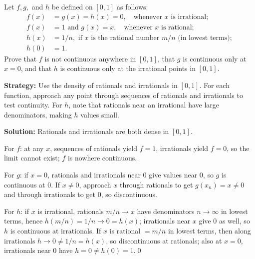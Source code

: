 \begin{problembox}
\begin{problemstatement}
Let \( f, g, \) and \( h \) be defined on \([0, 1]\) as follows:
\begin{align*}
f(x) &= g(x) = h(x) = 0, \quad \text{whenever } x \text{ is irrational}; \\
f(x) &= 1 \text{ and } g(x) = x, \quad \text{whenever } x \text{ is rational}; \\
h(x) &= 1/n, \text{ if } x \text{ is the rational number } m/n \text{ (in lowest terms)}; \\
h(0) &= 1.
\end{align*}
Prove that \( f \) is not continuous anywhere in \([0, 1]\), that \( g \) is continuous only at \( x = 0 \), and that \( h \) is continuous only at the irrational points in \([0, 1]\).
\end{problemstatement}
\end{problembox}

\noindent\textbf{Strategy:} Use the density of rationals and irrationals in $[0,1]$. For each function, approach any point through sequences of rationals and irrationals to test continuity. For $h$, note that rationals near an irrational have large denominators, making $h$ values small.

\bigskip\noindent\textbf{Solution:}
Rationals and irrationals are both dense in $[0,1]$.

For $f$: at any $x$, sequences of rationals yield $f=1$, irrationals yield $f=0$, so the limit cannot exist; $f$ is nowhere continuous.

For $g$: if $x=0$, rationals and irrationals near $0$ give values near $0$, so $g$ is continuous at $0$. If $x\ne0$, approach $x$ through rationals to get $g(x_n)=x\ne 0$ and through irrationals to get $0$, so discontinuous.

For $h$: if $x$ is irrational, rationals $m/n\to x$ have denominators $n\to\infty$ in lowest terms, hence $h(m/n)=1/n\to 0=h(x)$; irrationals near $x$ give $0$ as well, so $h$ is continuous at irrationals. If $x$ is rational $=m/n$ in lowest terms, then along irrationals $h\to 0\ne 1/n=h(x)$, so discontinuous at rationals; also at $x=0$, irrationals near $0$ have $h=0\ne h(0)=1$.\qed




